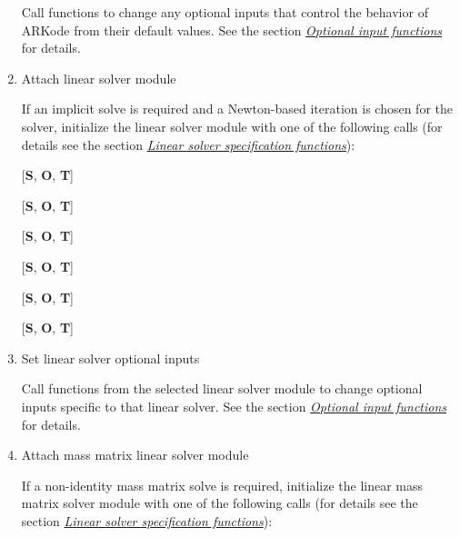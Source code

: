 \documentclass[letterpaper,10pt,english]{sphinxmanual}
\begin{document}
\begin{enumerate}
Call  functions to change any optional inputs that
control the behavior of ARKode from their default values. See
the section {\hyperref[c_interface/User_callable:cinterface-optionalinputs]{\emph{Optional input functions}}} for details.

\item {} 
Attach linear solver module

If an implicit solve is required and a Newton-based iteration is
chosen for the solver, initialize the linear solver module with one
of the following calls (for details see the section
{\hyperref[c_interface/User_callable:cinterface-linearsolvers]{\emph{Linear solver specification functions}}}):

{[}\textbf{S}, \textbf{O}, \textbf{T}{]} 

{[}\textbf{S}, \textbf{O}, \textbf{T}{]} 

{[}\textbf{S}, \textbf{O}, \textbf{T}{]} 

{[}\textbf{S}, \textbf{O}, \textbf{T}{]} 

{[}\textbf{S}, \textbf{O}, \textbf{T}{]} 

{[}\textbf{S}, \textbf{O}, \textbf{T}{]} 






\item {} 
Set linear solver optional inputs

Call  functions from the selected linear solver module to
change optional inputs specific to that linear solver. See the section
{\hyperref[c_interface/User_callable:cinterface-optionalinputs]{\emph{Optional input functions}}} for details.

\item {} 
Attach mass matrix linear solver module

If a non-identity mass matrix solve is required, initialize the
linear mass matrix solver module with one of the following calls
(for details see the section {\hyperref[c_interface/User_callable:cinterface-linearsolvers]{\emph{Linear solver specification functions}}}):


\end{enumerate}
\end{document}
